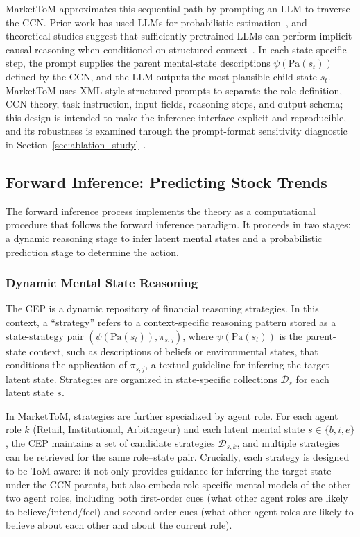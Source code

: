 \documentclass[a4paper,fleqn,doubleblind]{cas-sc}
\newcommand{\revise}[1]{{\color{blue}#1}}
\begin{document}
MarketToM approximates this sequential path by prompting an LLM to traverse the CCN. Prior work has used LLMs for probabilistic estimation~\citep{liu2025dellma, feng2025bird, requeima2024llm}, and theoretical studies suggest that sufficiently pretrained LLMs can perform implicit causal reasoning when conditioned on structured context~\citep{xie2022explanation, prystawski2023think, zhang2025and}. In each state-specific step, the prompt supplies the parent mental-state descriptions $\psi(\mathrm{Pa}(s_t))$ defined by the CCN, and the LLM outputs the most plausible child state $s_t$. \revise{MarketToM uses XML-style structured prompts to separate the role definition, CCN theory, task instruction, input fields, reasoning steps, and output schema; this design is intended to make the inference interface explicit and reproducible, and its robustness is examined through the prompt-format sensitivity diagnostic in Section~\ref{sec:ablation_study}~\citep{puerto2024code, li2025structured, mishra2023prompting}.}


\subsection{Forward Inference: Predicting Stock Trends}
The forward inference process implements the theory as a computational procedure that follows the forward inference paradigm. It proceeds in two stages: a dynamic reasoning stage to infer latent mental states and a probabilistic prediction stage to determine the action.


\subsubsection{Dynamic Mental State Reasoning}
The CEP is a dynamic repository of financial reasoning strategies. In this context, a ``strategy'' refers to a context-specific reasoning pattern stored as a state-strategy pair $(\psi(\text{Pa}(s_t)), \pi_{s,j})$, where $\psi(\text{Pa}(s_t))$ is the parent-state context, such as descriptions of beliefs or environmental states, that conditions the application of $\pi_{s,j}$, a textual guideline for inferring the target latent state. Strategies are organized in state-specific collections $\mathcal{D}_s$ for each latent state $s$.

In MarketToM, strategies are further specialized by agent role. For each agent role $k$ (Retail, Institutional, Arbitrageur) and each latent mental state $s \in \{b,i,e\}$, the CEP maintains a set of candidate strategies $\mathcal{D}_{s,k}$, and multiple strategies can be retrieved for the same role--state pair. Crucially, each strategy is designed to be ToM-aware: it not only provides guidance for inferring the target state under the CCN parents, but also embeds role-specific mental models of the other two agent roles, including both first-order cues (what other agent roles are likely to believe/intend/feel) and second-order cues (what other agent roles are likely to believe about each other and about the current role).
\end{document}
